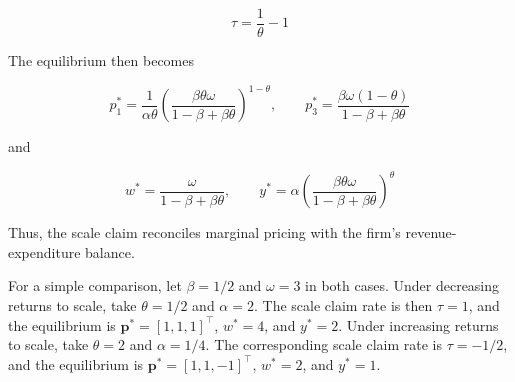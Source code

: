 \documentclass[
  letterpaper,
  DIV=11,
  numbers=noendperiod]{scrreprt}
\begin{document}
\[
\tau=\frac{1}{\theta}-1
\]

The equilibrium then becomes

\[
p_1^*=
\frac{1}{\alpha\theta}
\left(
\frac{\beta\theta\omega}{1-\beta+\beta\theta}
\right)^{1-\theta},
\qquad
p_3^*=
\frac{\beta\omega(1-\theta)}
{1-\beta+\beta\theta}
\]

and

\[
w^*=
\frac{\omega}{1-\beta+\beta\theta},
\qquad
y^*=
\alpha
\left(
\frac{\beta\theta\omega}
{1-\beta+\beta\theta}
\right)^\theta
\]

Thus, the scale claim reconciles marginal pricing with the firm's
revenue-expenditure balance.

For a simple comparison, let \(\beta=1/2\) and \(\omega=3\) in both
cases. Under decreasing returns to scale, take \(\theta=1/2\) and
\(\alpha=2\). The scale claim rate is then \(\tau=1\), and the
equilibrium is \(\mathbf p^*=[1,1,1]^\top\), \(w^*=4\), and \(y^*=2\).
Under increasing returns to scale, take \(\theta=2\) and \(\alpha=1/4\).
The corresponding scale claim rate is \(\tau=-1/2\), and the equilibrium
is \(\mathbf p^*=[1,1,-1]^\top\), \(w^*=2\), and \(y^*=1\).
\end{document}
